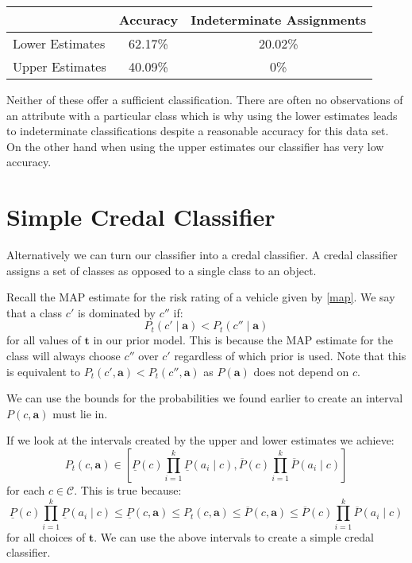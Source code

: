 \begin{center}
	\begin{tabular}{l|c c}
	                & Accuracy & Indeterminate Assignments \\
	\hline
	Lower Estimates & 62.17\%  & 20.02\%            \\
	Upper Estimates & 40.09\%  & 0\%                \\
	\end{tabular}
\end{center}

Neither of these offer a sufficient classification.
There are often no observations of an attribute with a particular class which is why using the lower estimates leads to indeterminate classifications despite a reasonable accuracy for this data set.
On the other hand when using the upper estimates our classifier has very low accuracy.

\section{Simple Credal Classifier}
Alternatively we can turn our classifier into a credal classifier.
A credal classifier assigns a set of classes as opposed to a single class to an object.

Recall the MAP estimate for the risk rating of a vehicle given by \cref{map}.
We say that a class $c'$ is dominated by $c''$ if:
\begin{equation}\label{Credal Dominance}
	P_t(c' \mid \mathbf{a}) < P_t(c'' \mid \mathbf{a})
\end{equation}
for all values of $\mathbf{t}$ in our prior model.
This is because the MAP estimate for the class will always choose $c''$ over $c'$ regardless of which prior is used.
Note that this is equivalent to $P_t(c', \mathbf{a}) < P_t(c'', \mathbf{a})$ as $P(\mathbf{a})$ does not depend on $c$.

We can use the bounds for the probabilities we found earlier to create an interval $P(c, \mathbf{a})$ must lie in. 

If we look at the intervals created by the upper and lower estimates we achieve:
\begin{equation}
	P_t(c, \mathbf{a}) \in \left[ \underline{P}(c)\prod_{i=1}^k \underline{P}(a_i \mid c), \overline{P}(c)\prod_{i=1}^k \overline{P}(a_i \mid c) \right]
\end{equation}
for each $c \in \mathcal{C}$.
This is true because:
\begin{equation}
\underline{P}(c)\prod_{i=1}^k \underline{P}(a_i \mid c) \leq \underline{P}(c, \mathbf{a}) \leq P_t(c, \mathbf{a}) \leq \overline{P}(c, \mathbf{a}) \leq \overline{P}(c)\prod_{i=1}^k \overline{P}(a_i \mid c)
\end{equation}
for all choices of $\mathbf{t}$.
We can use the above intervals to create a simple credal classifier.

